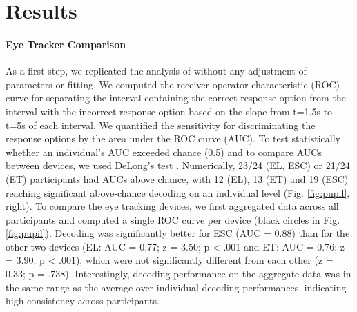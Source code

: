 \documentclass[manuscript]{acmart}
\begin{document}
\section{Results}

\paragraph{Eye Tracker Comparison} As a first step, we replicated the analysis of \cite{Stoll2013} without any adjustment of parameters or fitting. We computed the receiver operator characteristic (ROC) curve for separating the interval containing the correct response option from the interval with the incorrect response option based on the slope from t=1.5s to t=5s of each interval. We quantified the sensitivity for discriminating the response options by the area under the ROC curve (AUC). To test statistically whether an individual's AUC exceeded chance (0.5) and to compare AUCs between devices, we used DeLong's test \cite{deLong1988, Robin2011}. Numerically, 23/24 (EL, ESC) or 21/24 (ET) participants had AUCs above chance, with 12 (EL), 13 (ET) and 19 (ESC) reaching significant above-chance decoding on an individual level (Fig. \ref{fig:pupil}, right). To compare the eye tracking devices, we first aggregated data across all participants and computed a single ROC curve per device (black circles in Fig. \ref{fig:pupil}). Decoding was significantly better for ESC (AUC = 0.88) than for the other two devices (EL: AUC = 0.77; z = 3.50; p < .001 and ET: AUC = 0.76; z = 3.90; p < .001), which were not significantly different from each other (z = 0.33; p = .738). Interestingly, decoding performance on the aggregate data was in the same range as the average over individual decoding performances, indicating high consistency across participants. 
\end{document}
